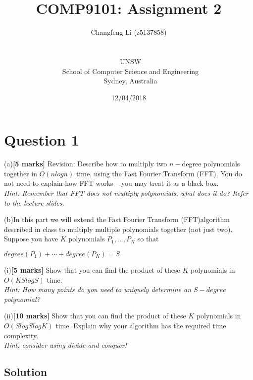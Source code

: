 \documentclass[a4paper,12pt]{article}
\title{COMP9101: Assignment 2}
\author{Changfeng Li (z5137858)\\
\date{12/04/2018}\\
\ UNSW\\
\ School of Computer Science and Engineering\\[-0.3ex]
\ Sydney, Australia\\
}
\begin{document}
\maketitle


\newpage

\section*{Question 1}
\setlength{\parindent}{0pt} %

(a)\textbf{[5 marks]} Revision: Describe how to multiply two $n-$degree polynomials together in $O(nlogn)$ time, using the Fast Fourier Transform (FFT). You do not need to explain how FFT works $–$ you may treat it as a black box. \\
\textit{Hint:  Remember that FFT does not multiply polynomials, what does it do? Refer to the lecture slides.}

(b)In this part we will extend the Fast Fourier Transform (FFT)algorithm described in class to multiply multiple polynomials together (not just two).\\
Suppose you have $K$ polynomials $P_1, . . . , P_K$ so that \\
\begin{center} $degree(P_1) + \cdots + degree(P_K) = S$ \end{center}

\setlength{\parindent}{2em}
(i)\textbf{[5 marks]} Show that you can find the product of these $K$ polynomials in
$O(KSlogS)$ time.\\
\textit{Hint:   How  many  points  do  you  need  to  uniquely  determine  an
$S-degree$ polynomial?}

(ii)\textbf{[10 marks]} Show that you can find the product of these
$K$ polynomials in $O(SlogSlogK)$ time. Explain why your algorithm has the required time complexity.\\
\textit{Hint: consider using divide-and-conquer!}




\subsection*{Solution}
\setlength{\parindent}{0pt} %
\end{document}
